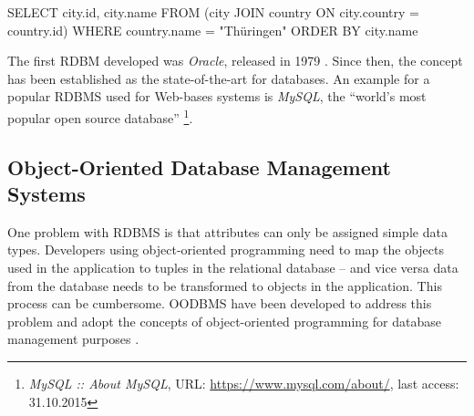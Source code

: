 \vspace{-1em}
\begin{verbatimtab}
  SELECT     city.id, city.name
  FROM       (city JOIN country ON city.country = country.id)
  WHERE      country.name = "Thüringen"
  ORDER BY   city.name
\end{verbatimtab}
\vspace{-1em}

The first RDBM developed was \emph{Oracle}, released in 1979 \cite{oracleDB}. Since then, the concept has been established as the state-of-the-art for databases. An example for a popular RDBMS used for Web-bases systems is \emph{MySQL}, the ``world's most popular open source database''
\footnote{
  \emph{MySQL :: About MySQL},
  URL: \url{https://www.mysql.com/about/},
  last access: 31.10.2015
}.



\subsection{Object-Oriented Database Management Systems} %
\label{sub:object_oriented_database_management_systems}

One problem with RDBMS is that attributes can only be assigned simple data types. Developers using object-oriented programming need to map the objects used in the application to tuples in the relational database -- and vice versa data from the database needs to be transformed to objects in the application. This process can be cumbersome. OODBMS have been developed to address this problem and adopt the concepts of object-oriented programming for database management purposes \cite{oodbms}.

